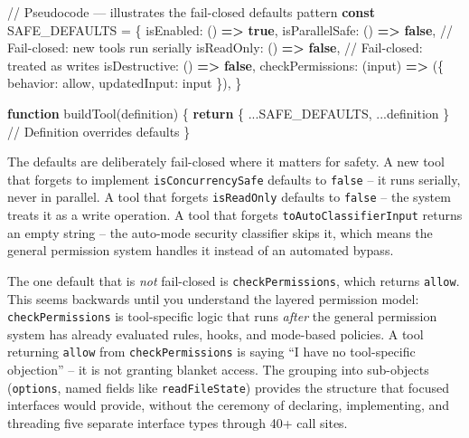 \documentclass[
  english,
  11pt,
  letterpaper,
]{book}
\newenvironment{Shaded}{\begin{snugshade}}{\end{snugshade}}
\newcommand{\CommentTok}[1]{\textcolor[rgb]{0.37,0.37,0.37}{#1}}
\newcommand{\ControlFlowTok}[1]{\textcolor[rgb]{0.00,0.23,0.31}{\textbf{#1}}}
\newcommand{\FunctionTok}[1]{\textcolor[rgb]{0.28,0.35,0.67}{#1}}
\newcommand{\KeywordTok}[1]{\textcolor[rgb]{0.00,0.23,0.31}{\textbf{#1}}}
\newcommand{\NormalTok}[1]{\textcolor[rgb]{0.00,0.23,0.31}{#1}}
\newcommand{\OperatorTok}[1]{\textcolor[rgb]{0.37,0.37,0.37}{#1}}
\newcommand{\StringTok}[1]{\textcolor[rgb]{0.13,0.47,0.30}{#1}}
\begin{document}
\begin{Shaded}
\begin{Highlighting}[]
\CommentTok{// Pseudocode — illustrates the fail{-}closed defaults pattern}
\KeywordTok{const}\NormalTok{ SAFE\_DEFAULTS }\OperatorTok{=}\NormalTok{ \{}
\NormalTok{  isEnabled}\OperatorTok{:}\NormalTok{         () }\KeywordTok{=\textgreater{}} \KeywordTok{true}\OperatorTok{,}
\NormalTok{  isParallelSafe}\OperatorTok{:}\NormalTok{    () }\KeywordTok{=\textgreater{}} \KeywordTok{false}\OperatorTok{,}   \CommentTok{// Fail{-}closed: new tools run serially}
\NormalTok{  isReadOnly}\OperatorTok{:}\NormalTok{        () }\KeywordTok{=\textgreater{}} \KeywordTok{false}\OperatorTok{,}   \CommentTok{// Fail{-}closed: treated as writes}
\NormalTok{  isDestructive}\OperatorTok{:}\NormalTok{     () }\KeywordTok{=\textgreater{}} \KeywordTok{false}\OperatorTok{,}
\NormalTok{  checkPermissions}\OperatorTok{:}\NormalTok{  (input) }\KeywordTok{=\textgreater{}}\NormalTok{ (\{ behavior}\OperatorTok{:} \StringTok{\textquotesingle{}allow\textquotesingle{}}\OperatorTok{,}\NormalTok{ updatedInput}\OperatorTok{:}\NormalTok{ input \})}\OperatorTok{,}
\NormalTok{\}}

\KeywordTok{function} \FunctionTok{buildTool}\NormalTok{(definition) \{}
  \ControlFlowTok{return}\NormalTok{ \{ }\OperatorTok{...}\NormalTok{SAFE\_DEFAULTS}\OperatorTok{,} \OperatorTok{...}\NormalTok{definition \}  }\CommentTok{// Definition overrides defaults}
\NormalTok{\}}
\end{Highlighting}
\end{Shaded}

The defaults are deliberately fail-closed where it matters for safety. A
new tool that forgets to implement \texttt{isConcurrencySafe} defaults
to \texttt{false} -- it runs serially, never in parallel. A tool that
forgets \texttt{isReadOnly} defaults to \texttt{false} -- the system
treats it as a write operation. A tool that forgets
\texttt{toAutoClassifierInput} returns an empty string -- the auto-mode
security classifier skips it, which means the general permission system
handles it instead of an automated bypass.

The one default that is \emph{not} fail-closed is
\texttt{checkPermissions}, which returns \texttt{allow}. This seems
backwards until you understand the layered permission model:
\texttt{checkPermissions} is tool-specific logic that runs \emph{after}
the general permission system has already evaluated rules, hooks, and
mode-based policies. A tool returning \texttt{allow} from
\texttt{checkPermissions} is saying ``I have no tool-specific
objection'' -- it is not granting blanket access. The grouping into
sub-objects (\texttt{options}, named fields like \texttt{readFileState})
provides the structure that focused interfaces would provide, without
the ceremony of declaring, implementing, and threading five separate
interface types through 40+ call sites.
\end{document}
